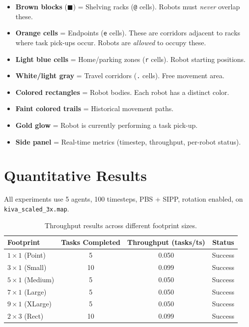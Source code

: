 \documentclass[12pt, a4paper]{article}
\begin{document}
\begin{itemize}
    \item \textbf{Brown blocks} ($\blacksquare$) = Shelving racks (\texttt{@} cells). Robots must \emph{never} overlap these.
    \item \textbf{Orange cells} = Endpoints (\texttt{e} cells). These are corridors adjacent to racks where task pick-ups occur. Robots are \emph{allowed} to occupy these.
    \item \textbf{Light blue cells} = Home/parking zones (\texttt{r} cells). Robot starting positions.
    \item \textbf{White/light gray} = Travel corridors (\texttt{.} cells). Free movement area.
    \item \textbf{Colored rectangles} = Robot bodies. Each robot has a distinct color.
    \item \textbf{Faint colored trails} = Historical movement paths.
    \item \textbf{Gold glow} = Robot is currently performing a task pick-up.
    \item \textbf{Side panel} = Real-time metrics (timestep, throughput, per-robot status).
\end{itemize}

\section{Quantitative Results}
\label{sec:results}

All experiments use 5 agents, 100 timesteps, PBS + SIPP, rotation enabled, on \texttt{kiva\_scaled\_3x.map}.

\begin{table}[H]
\centering
\begin{tabular}{@{}lccc@{}}
\toprule
\textbf{Footprint} & \textbf{Tasks Completed} & \textbf{Throughput (tasks/ts)} & \textbf{Status} \\
\midrule
$1\times1$ (Point)   & 5  & 0.050 & \textcolor{green!60!black}{Success} \\
$3\times1$ (Small)   & 10 & 0.099 & \textcolor{green!60!black}{Success} \\
$5\times1$ (Medium)  & 5  & 0.050 & \textcolor{green!60!black}{Success} \\
$7\times1$ (Large)   & 5  & 0.050 & \textcolor{green!60!black}{Success} \\
$9\times1$ (XLarge)  & 5  & 0.050 & \textcolor{green!60!black}{Success} \\
$2\times3$ (Rect)    & 10 & 0.099 & \textcolor{green!60!black}{Success} \\
\bottomrule
\end{tabular}
\caption{Throughput results across different footprint sizes.}
\label{tab:results}
\end{table}
\end{document}
